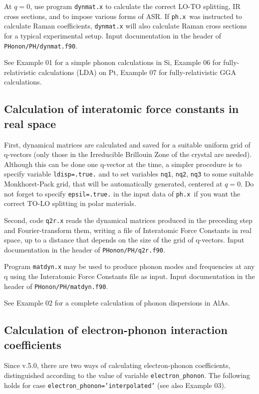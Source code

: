 \documentclass[12pt,a4paper]{article}
\def\phx{\texttt{ph.x}}
\begin{document}
At $q=0$, use program \texttt{dynmat.x} to calculate the correct LO-TO 
splitting, IR cross sections, and to impose various forms of ASR. 
If \phx\ was instructed to calculate Raman coefficients, 
\texttt{dynmat.x} will also calculate Raman cross sections
for a typical experimental setup.
Input documentation in the header of \texttt{PHonon/PH/dynmat.f90}.

See Example 01 for a simple phonon calculations in Si, Example 06 for 
fully-relativistic calculations (LDA) on Pt, Example 07 for 
fully-relativistic GGA calculations.

\subsection{Calculation of interatomic force constants in real space}

First, dynamical matrices are calculated and saved for a suitable uniform 
grid of q-vectors (only those in the Irreducible Brillouin Zone of the
crystal are needed). Although this can be done one q-vector at the time, a
simpler procedure is to specify variable \texttt{ldisp=.true.} and to set 
variables \texttt{nq1}, \texttt{nq2}, \texttt{nq3} to some suitable 
Monkhorst-Pack grid, that will be automatically generated, centered at $q=0$. 
Do not forget to specify \texttt{epsil=.true.} in the input data of
\phx\ if you want the correct TO-LO splitting in polar
materials.
    
Second, code \texttt{q2r.x} reads the dynamical matrices produced in the
preceding step and Fourier-transform them, writing a file of Interatomic Force
Constants in real space, up to a distance that depends on the size of the grid
of q-vectors. Input documentation in the header of \texttt{PHonon/PH/q2r.f90}.

Program \texttt{matdyn.x} may be used to produce phonon modes and
frequencies at any q using the Interatomic Force Constants file as input.
Input documentation in the header of \texttt{PHonon/PH/matdyn.f90}.

See Example 02 for a complete calculation of phonon dispersions in AlAs.

\subsection{Calculation of electron-phonon interaction coefficients}

Since v.5.0, there are two ways of calculating electron-phonon
coefficients, distinguished according to the value of variable 
\texttt{electron\_phonon}. The following holds for case
\texttt{electron\_phonon='interpolated'} (see also Example 03).
\end{document}
